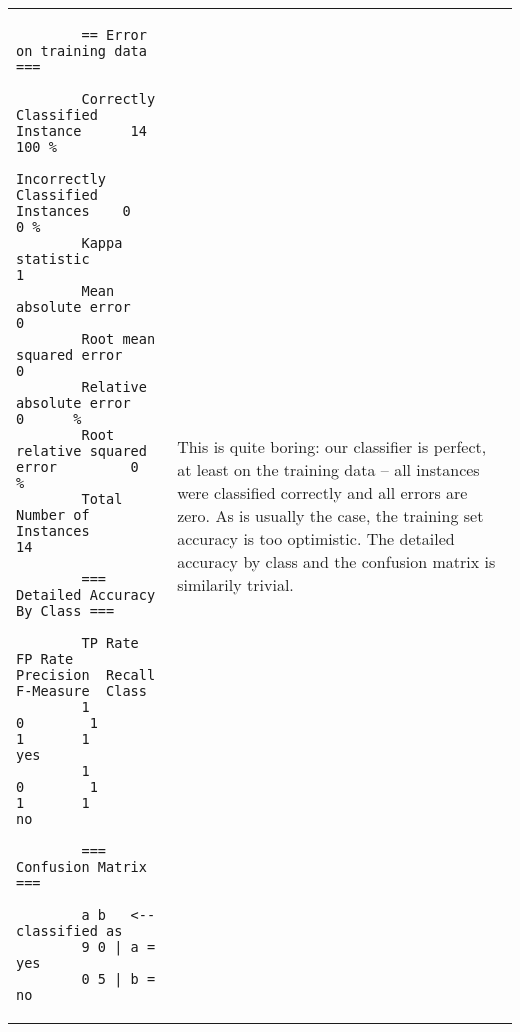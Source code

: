 \vspace{0.5cm}
\noindent
\begin{tabular}{l l}
	\begin{minipage}{7cm}
		{\scriptsize
		\begin{verbatim}
		== Error on training data ===
		
		Correctly Classified Instance      14      100 %
		Incorrectly Classified Instances    0      0 %
		Kappa statistic                     1     
		Mean absolute error                 0     
		Root mean squared error             0     
		Relative absolute error             0      %
		Root relative squared error         0      %
		Total Number of Instances          14     
		
		=== Detailed Accuracy By Class ===
		
		TP Rate  FP Rate  Precision  Recall  F-Measure  Class
		1        0        1          1       1          yes
		1        0        1          1       1          no
		
		=== Confusion Matrix ===
		
		a b   <-- classified as
		9 0 | a = yes
		0 5 | b = no
		\end{verbatim}}
	\end{minipage}
	&
	\begin{minipage}{5cm}
	This is quite boring: our classifier is perfect, at least on the training data -- all instances were classified correctly and all errors are zero. As is usually the case, the training set accuracy is too optimistic. The detailed accuracy by class and the confusion matrix is similarily trivial.
	\end{minipage}
	\\
\end{tabular}


